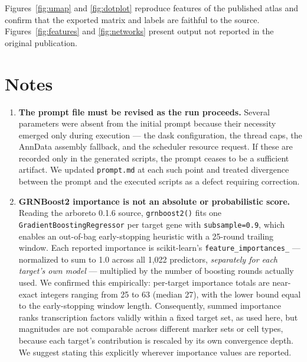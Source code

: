 \documentclass[11pt,a4paper]{article}
\begin{document}
Figures~\ref{fig:umap} and \ref{fig:dotplot} reproduce features of the published atlas \cite{baumgart2025} and confirm that the exported matrix and labels are faithful to the source. Figures~\ref{fig:features} and \ref{fig:networks} present output not reported in the original publication.

\section{Notes}

\begin{enumerate}[leftmargin=*]


\item \textbf{The prompt file must be revised as the run proceeds.} Several parameters were absent from the initial prompt because their necessity emerged only during execution --- the dask configuration, the thread caps, the AnnData assembly fallback, and the scheduler resource request. If these are recorded only in the generated scripts, the prompt ceases to be a sufficient artifact. We updated \texttt{prompt.md} at each such point and treated divergence between the prompt and the executed scripts as a defect requiring correction.

\item \textbf{GRNBoost2 importance is not an absolute or probabilistic score.} Reading the arboreto 0.1.6 source, \texttt{grnboost2()} fits one \texttt{GradientBoostingRegressor} \cite{pedregosa2011} per target gene with \texttt{subsample=0.9}, which enables an out-of-bag early-stopping heuristic with a 25-round trailing window. Each reported importance is scikit-learn's \texttt{feature\_importances\_} --- normalized to sum to 1.0 across all 1,022 predictors, \textit{separately for each target's own model} --- multiplied by the number of boosting rounds actually used. We confirmed this empirically: per-target importance totals are near-exact integers ranging from 25 to 63 (median 27), with the lower bound equal to the early-stopping window length. Consequently, summed importance ranks transcription factors validly within a fixed target set, as used here, but magnitudes are not comparable across different marker sets or cell types, because each target's contribution is rescaled by its own convergence depth. We suggest stating this explicitly wherever importance values are reported.


\end{enumerate}
\end{document}
